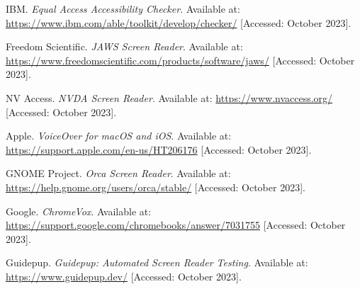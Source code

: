 \begin{thebibliography}{99}
 IBM. \textit{Equal Access Accessibility Checker}. Available at: \url{https://www.ibm.com/able/toolkit/develop/checker/} [Accessed: October 2023].

 Freedom Scientific. \textit{JAWS Screen Reader}. Available at: \url{https://www.freedomscientific.com/products/software/jaws/} [Accessed: October 2023].

 NV Access. \textit{NVDA Screen Reader}. Available at: \url{https://www.nvaccess.org/} [Accessed: October 2023].

 Apple. \textit{VoiceOver for macOS and iOS}. Available at: \url{https://support.apple.com/en-us/HT206176} [Accessed: October 2023].

 GNOME Project. \textit{Orca Screen Reader}. Available at: \url{https://help.gnome.org/users/orca/stable/} [Accessed: October 2023].

 Google. \textit{ChromeVox}. Available at: \url{https://support.google.com/chromebooks/answer/7031755} [Accessed: October 2023].

 Guidepup. \textit{Guidepup: Automated Screen Reader Testing}. Available at: \url{https://www.guidepup.dev/} [Accessed: October 2023].

\end{thebibliography}
